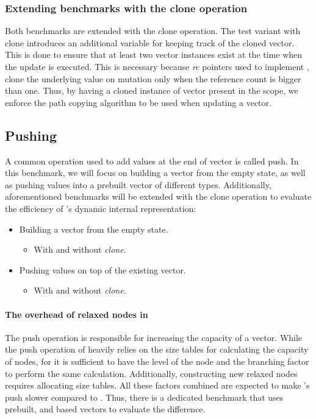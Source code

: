 \subsubsection*{Extending benchmarks with the clone operation}
Both benchmarks are extended with the clone operation. The test variant with clone introduces an additional variable for keeping track of the cloned vector. This is done to ensure that at least two vector instances exist at the time when the update is executed. This is necessary because \emph{rc} pointers used to implement \rbtree{}, clone the underlying value on mutation only when the reference count is bigger than one. Thus, by having a cloned instance of vector present in the scope, we enforce the path copying algorithm to be used when updating a vector. 

\subsection{Pushing}
A common operation used to add values at the end of vector is called push. In this benchmark, we will focus on building a vector from the empty state, as well as pushing values into a prebuilt vector of different types. Additionally, aforementioned benchmarks will be extended with the clone operation to evaluate the efficiency of \pvec{}'s dynamic internal representation:
\begin{itemize}
    \item Building a vector from the empty state.    
    \begin{itemize}
        \item With and without \emph{clone}. 
    \end{itemize}
    \item Pushing values on top of the existing vector.
    \begin{itemize}
        \item With and without \emph{clone}. 
    \end{itemize}
\end{itemize}

\paragraph*{The overhead of relaxed nodes in \rrbtree{}}
The push operation is responsible for increasing the capacity of a vector. While the push operation of \rrbtree{} heavily relies on the size tables for calculating the capacity of nodes, for \rbtree{} it is sufficient to have the level of the node and the branching factor to perform the same calculation. Additionally, constructing new relaxed nodes requires allocating size tables. All these factors combined are expected to make \rrbtree{}'s push slower compared to \rbtree{}. Thus, there is a dedicated benchmark that uses prebuilt, \rrbtree{} and \rbtree{} based vectors to evaluate the difference.  

